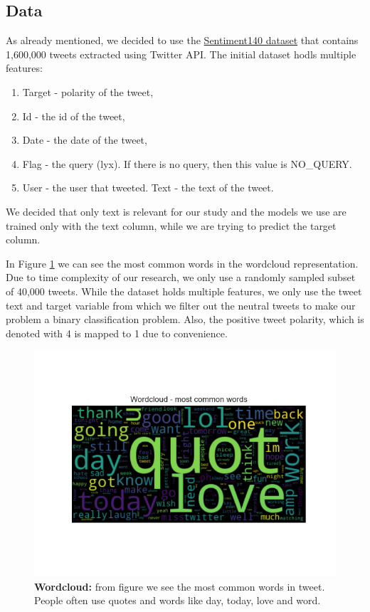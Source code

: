 \documentclass[conference]{IEEEtran}
\begin{document}
\subsection{Data}
As already mentioned, we decided to use the \href{https://www.kaggle.com/kazanova/sentiment140}{Sentiment140 dataset} \cite{sentiment140} that contains 1,600,000 tweets extracted using Twitter API. The initial dataset hodls multiple features:
\begin{enumerate}
	\item Target - polarity of the tweet,
	\item Id - the id of the tweet,
	\item Date - the date of the tweet,
	\item Flag - the query (lyx). If there is no query, then this value is NO\_QUERY.
	\item User - the user that tweeted.
	\text Text - the text of the tweet.
\end{enumerate}
We decided that only text is relevant for our study and the models we use are trained only with the text column, while we are trying to predict the target column.

In Figure \ref{pic1} we can see the most common words in the wordcloud representation. Due to time complexity of our research, we only use a randomly sampled subset of 40,000 tweets. While the dataset holds multiple features, we only use the tweet text and target variable from which we filter out the neutral tweets to make our problem a binary classification problem. Also, the positive tweet polarity, which is denoted with 4 is mapped to 1 due to convenience.

\begin{figure}[hbt!]\centering
\centering
\includegraphics[width=\linewidth]{wordcloud}
\caption{\textbf{Wordcloud:} from figure we see the most common words in tweet. People often use quotes and words like day, today, love and word.}
\label{pic1}
\end{figure}
\end{document}
